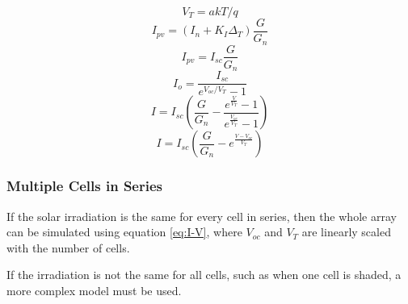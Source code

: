 \begin{minipage}{0.3\textwidth}
    \begin{equation} \label{eq:thermalvoltage}
        V_T = a k T / q
    \end{equation}
    \begin{equation} \label{eq:cellcurrent}
        I_{pv} = \left( I_n + K_I \Delta_T \right) \frac{G}{G_n}
    \end{equation}
    \begin{equation} \label{eq:I_pv}
        I_{pv} = I_{sc} \frac{G}{G_n}
    \end{equation}
    \begin{equation} \label{eq:I_o}
        I_o = \frac{I_{sc}}{e^{V_{oc} / V_T} - 1}
    \end{equation}
    \begin{equation} \label{eq:IAlmostDone}
        I = I_{sc} \left( \frac{G}{G_n} - \frac{e^{\frac{V}{V_T}}-1}{e^{\frac{V_{oc}}{V_T}}-1} \right)
    \end{equation}
    \begin{equation} \label{eq:I-V}
        I = I_{sc} \left( \frac{G}{G_n} - e^{\frac{V - V_{oc}}{V_T}} \right)
    \end{equation}
\end{minipage}



\subsubsection{Multiple Cells in Series}

If the solar irradiation is the same  for  every  cell in series, then the whole
array  can be simulated using equation \eqref{eq:I-V}, where $V_{oc}$  and  $V_T$
are linearly scaled with the number of cells.

If the irradiation is not the same for all  cells,  such  as  when  one  cell  is
shaded, a more complex model must be used.

